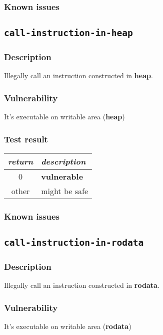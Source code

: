 \documentclass[a4paper]{book}
\begin{document}
\subsubsection{Known issues}

\newpage

\subsection{\texttt{call-instruction-in-heap}}\label{test-call-instruction-in-heap}
\subsubsection{Description}
Illegally call an instruction constructed in \textbf{heap}.
\subsubsection{Vulnerability}
It’s executable on writable area (\textbf{heap})
\subsubsection{Test result}
\begin{tabular}{cl}
  \toprule
  \emph{return}  & \emph{description} \\
  \midrule
  0              & \textbf{vulnerable} \\
  other          & might be safe \\
  \bottomrule
\end{tabular}
  
\subsubsection{Known issues}

\newpage

\subsection{\texttt{call-instruction-in-rodata}}\label{test-call-instruction-in-rodata}
\subsubsection{Description}
Illegally call an instruction constructed in \textbf{rodata}.
\subsubsection{Vulnerability}
It’s executable on writable area (\textbf{rodata})
\end{document}
